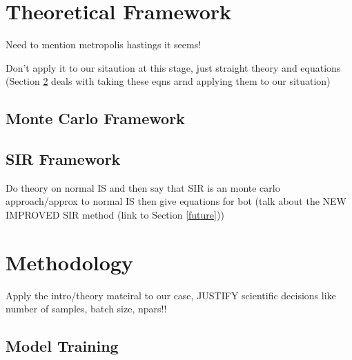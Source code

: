 \documentclass[aps,superscriptaddress,twocolumn,nopreprintnumbers,floatfix,groupedaddress]{revtex4-1}
\begin{document}
\section{Theoretical Framework}\label{theory}

Need to mention metropolis hastings it seems!

Don't apply it to our sitaution at this stage, just straight theory and equations (Section \ref{methods} deals with taking these eqns arnd applying them to our situation)

\subsection{Monte Carlo Framework}\label{theory:monte}

\subsection{SIR Framework}\label{theory:sir}

Do theory on normal IS and then say that SIR is an monte carlo approach/approx to normal IS then give equations for bot (talk about the NEW IMPROVED SIR method (link to Section \ref{future}))

%

\section{Methodology}\label{methods}

Apply the intro/theory mateiral to our case, JUSTIFY scientific decisions like number of samples, batch size, npars!!

\subsection{Model Training}
\end{document}
